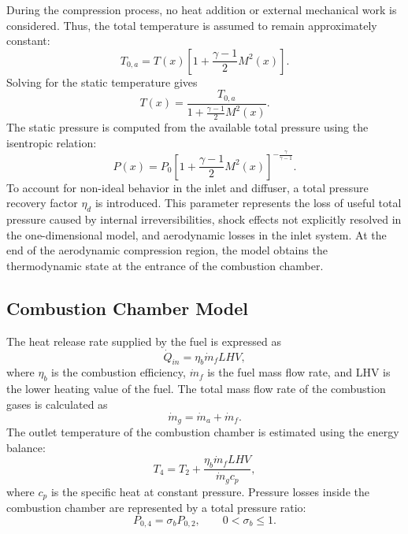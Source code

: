 \documentclass[preprint,12pt]{elsarticle}
\begin{document}
During the compression process, no heat addition or external mechanical work is considered. Thus, the total temperature is assumed to remain approximately constant:
\begin{equation}
T_{0,a}=T(x)\left[1+\frac{\gamma-1}{2}M^2(x)\right].
\end{equation}
Solving for the static temperature gives
\begin{equation}
T(x)=
\frac{T_{0,a}}
{1+\frac{\gamma-1}{2}M^2(x)}.
\end{equation}
The static pressure is computed from the available total pressure using the isentropic relation:
\begin{equation}
P(x)=P_0
\left[
1+\frac{\gamma-1}{2}M^2(x)
\right]^{-\frac{\gamma}{\gamma-1}}.
\end{equation}
To account for non-ideal behavior in the inlet and diffuser, a total pressure recovery factor $\eta_d$ is introduced. This parameter represents the loss of useful total pressure caused by internal irreversibilities, shock effects not explicitly resolved in the one-dimensional model, and aerodynamic losses in the inlet system. At the end of the aerodynamic compression region, the model obtains the thermodynamic state at the entrance of the combustion chamber.
\subsection{Combustion Chamber Model}
The heat release rate supplied by the fuel is expressed as
\begin{equation}
\dot{Q}_{in}=\eta_b \dot{m}_f LHV,
\end{equation}
where $\eta_b$ is the combustion efficiency, $\dot{m}_f$ is the fuel mass flow rate, and LHV is the lower heating value of the fuel.
The total mass flow rate of the combustion gases is calculated as
\begin{equation}
\dot{m}_g = \dot{m}_a+\dot{m}_f.
\end{equation}
The outlet temperature of the combustion chamber is estimated using the energy balance:
\begin{equation}
T_4 = T_2 +
\frac{\eta_b \dot{m}_f LHV}
{\dot{m}_g c_p},
\end{equation}
where $c_p$ is the specific heat at constant pressure.
Pressure losses inside the combustion chamber are represented by a total pressure ratio:
\begin{equation}
P_{0,4}=\sigma_b P_{0,2},
\qquad 0<\sigma_b \leq 1.
\end{equation}
\end{document}
